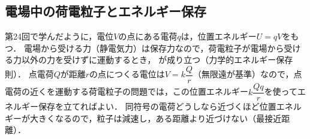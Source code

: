 %
%

\setcounter{nombre}{24}

\subsection{電場中の荷電粒子とエネルギー保存}

第24回で学んだように，電位$V$の点にある電荷$q$は，位置エネルギー$U=qV$をもつ．
電場から受ける力（静電気力）は保存力なので，荷電粒子が電場から受ける力以外の力を受けずに運動するとき，
が成り立つ（力学的エネルギー保存則）．
点電荷$Q$が距離$r$の点につくる電位は$V=k\dfrac{Q}{r}$（無限遠が基準）なので，点電荷の近くを運動する荷電粒子の問題では，この位置エネルギー$k\dfrac{Qq}{r}$を使ってエネルギー保存を立てればよい．
同符号の電荷どうしなら近づくほど位置エネルギーが大きくなるので，粒子は減速し，ある距離より近づけない（最接近距離）．

